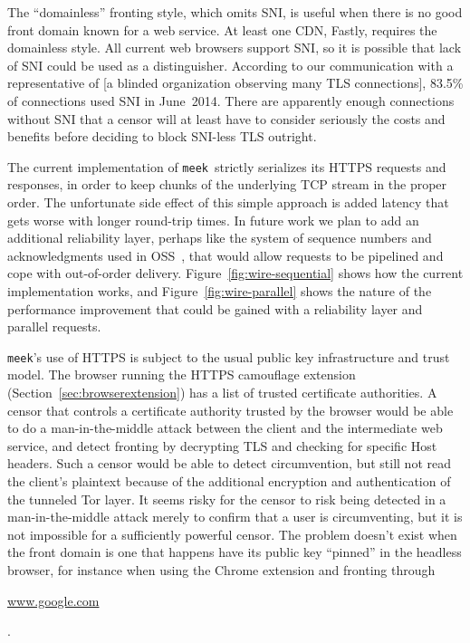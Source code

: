 \documentclass[conference]{IEEEtran}
\newcommand{\meek}{\texttt{meek}\xspace}
\def\urll#1{\begin{NoHyper}\url{#1}\end{NoHyper}}
\begin{document}
The ``domainless'' fronting style, which omits SNI,
is useful when there is no good front domain known for a web service.
At least one CDN, Fastly, requires the domainless style.
All current web browsers support SNI,
so it is possible that lack of SNI could be used as a distinguisher.
According to our communication with
a representative of
[a blinded organization observing many TLS connections],
83.5\% of connections used SNI in June~2014.
There are apparently enough connections without SNI
that a censor will at least have to consider seriously
the costs and benefits before deciding to block SNI-less TLS outright.

The current implementation of \meek\ strictly serializes
its HTTPS requests and responses,
in order to keep chunks of the underlying TCP stream
in the proper order.
The unfortunate side effect of this simple approach
is added latency that gets worse with longer round-trip times.
In future work we plan to add an additional reliability layer,
perhaps like the system of sequence numbers and acknowledgments used in OSS~\cite{oss},
that would allow requests to be pipelined
and cope with out-of-order delivery.
Figure~\ref{fig:wire-sequential} shows how the current implementation works,
and Figure~\ref{fig:wire-parallel} shows the nature of the performance
improvement that could be gained with a reliability layer
and parallel requests.

\meek's use of HTTPS is subject to the usual public key infrastructure
and trust model.
The browser running the HTTPS camouflage extension (Section~\ref{sec:browserextension})
has a list of trusted certificate authorities.
A censor that controls a certificate authority trusted by the browser
would be able to do a man-in-the-middle attack
between the client and the intermediate web service,
and detect fronting by decrypting TLS and checking for specific Host headers.
Such a censor would be able to detect circumvention,
but still not read the client's plaintext because of the
additional encryption and authentication of the tunneled Tor layer.
It seems risky for the censor to risk being detected in
a man-in-the-middle attack merely to confirm that a user is circumventing,
but it is not impossible for a sufficiently powerful censor.
The problem doesn't exist when the front domain is one
that happens have its public key ``pinned'' in the headless browser,
for instance when using the Chrome extension and fronting through
\urll{www.google.com}.
\end{document}
